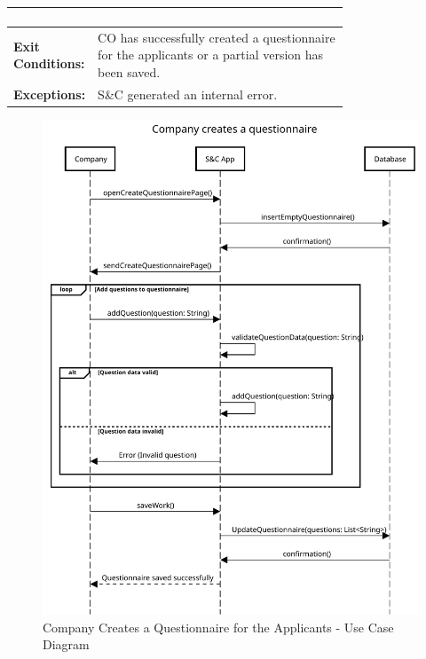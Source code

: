 \begin{center}
\begin{longtable}{|l|p{0.75\linewidth}|}
\begin{enumerate}
                                     \end{enumerate}                                \\
        \hline
        \textbf{Exit Conditions:}  & CO has successfully created a questionnaire for the applicants or a partial version has been saved.       \\
        \hline
        \textbf{Exceptions:}       & S\&C generated an internal error.                                                                         \\
        \hline
    \end{longtable}
\end{center}

\begin{figure}[H]
    \centering
    \includegraphics[width=1.0\textwidth]{Images/UC_11.pdf}
    \caption{Company Creates a Questionnaire for the Applicants - Use Case Diagram}
    \label{fig:use-case-diagram-11}
\end{figure}

